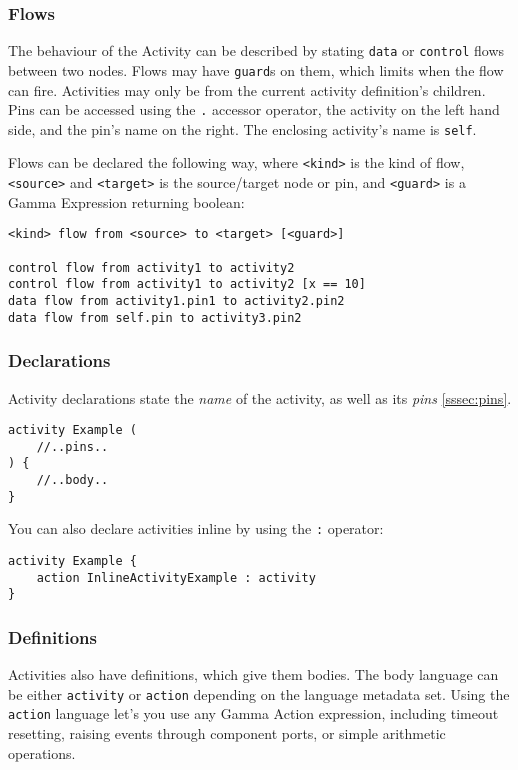 \subsubsection{Flows}\label{sssec:flows}

The behaviour of the Activity can be described by stating \verb|data| or \verb|control| flows between two nodes. Flows may have \verb|guard|s on them, which limits when the flow can fire. Activities may only be from the current activity definition's children. Pins can be accessed using the \verb|.| accessor operator, the activity on the left hand side, and the pin's name on the right. The enclosing activity's name is \verb|self|.

Flows can be declared the following way, where \verb|<kind>| is the kind of flow, \verb|<source>| and \verb|<target>| is the source/target node or pin, and \verb|<guard>| is a Gamma Expression returning boolean:

\begin{lstlisting}[language=activity]
<kind> flow from <source> to <target> [<guard>]

control flow from activity1 to activity2
control flow from activity1 to activity2 [x == 10]
data flow from activity1.pin1 to activity2.pin2
data flow from self.pin to activity3.pin2
\end{lstlisting}

\subsubsection{Declarations}

Activity declarations state the \emph{name} of the activity, as well as its \emph{pins} \ref{sssec:pins}. 

\begin{lstlisting}[language=activity]
activity Example (
	//..pins..
) {
	//..body..
}
\end{lstlisting}

You can also declare activities inline by using the \verb|:| operator:

\begin{lstlisting}[language=activity]
activity Example {
	action InlineActivityExample : activity
}
\end{lstlisting}

\subsubsection{Definitions}

Activities also have definitions, which give them bodies. The body language can be either \verb|activity| or \verb|action| depending on the language metadata set. Using the \verb|action| language let's you use any Gamma Action expression, including timeout resetting, raising events through component ports, or simple arithmetic operations.

